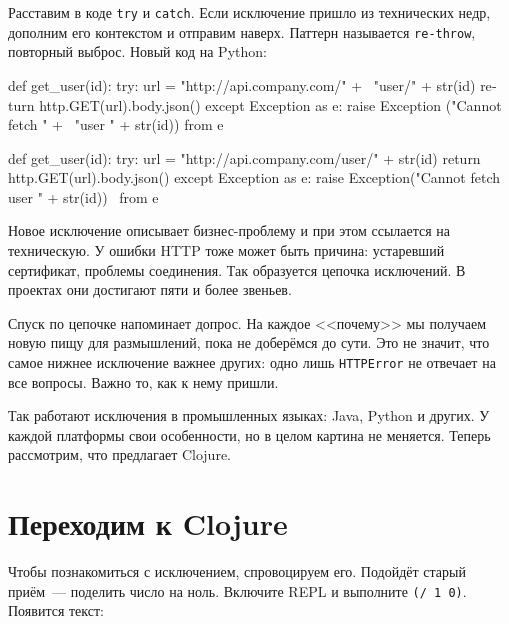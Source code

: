 Расставим в коде \verb|try| и \verb|catch|. Если исключение пришло из
технических недр, дополним его контекстом и отправим наверх. Паттерн называется
\verb|re-throw|, повторный выброс. Новый код на Python:

\ifnarrow

\begin{english}
  \begin{python}
def get_user(id):
  try:
    url = "http://api.company.com/" + \
          "user/" + str(id)
    return http.GET(url).body.json()
  except Exception as e:
    raise Exception ("Cannot fetch " + \
          "user " + str(id)) from e
  \end{python}
\end{english}

\else

\begin{english}
  \begin{python}
def get_user(id):
  try:
    url = "http://api.company.com/user/" + str(id)
    return http.GET(url).body.json()
  except Exception as e:
    raise Exception("Cannot fetch user " + str(id)) \
      from e
  \end{python}
\end{english}

\fi


Новое исключение описывает бизнес-проб\-ле\-му и при этом ссылается на
техническую. У ошибки HTTP тоже может быть причина: устаревший сертификат,
проблемы соединения. Так образуется цепочка исключений. В проектах они достигают
пяти и более звеньев.

Спуск по цепочке напоминает допрос. На каждое <<почему>> мы получаем новую пищу
для размышлений, пока не доберёмся до сути. Это не значит, что самое нижнее
исключение важнее других: одно лишь \verb|HTTPError| не отвечает на все
вопросы. Важно то, как к нему пришли.

Так работают исключения в промышленных языках: Java, Python и других. У каждой
платформы свои особенности, но в целом картина не меняется. Теперь рассмотрим,
что предлагает Clojure.

\section{Переходим к Clojure}

Чтобы познакомиться с исключением, спровоцируем его. Подойдёт старый
приём~--- поделить число на ноль. Включите REPL и выполните
\verb|(/ 1 0)|. Появится текст:


